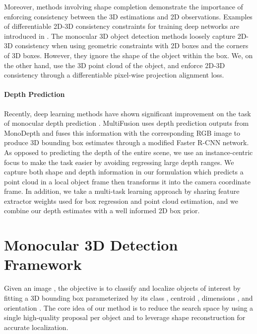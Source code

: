 \documentclass[10pt,twocolumn,letterpaper]{article}
\begin{document}
	Moreover, methods involving shape completion \cite{dai2017shape, firman2016structured, rock2015completing} demonstrate the importance of enforcing consistency between the 3D estimations and 2D observations. Examples of differentiable 2D-3D consistency constraints for training deep networks are introduced in \cite{rezende2016unsupervised, tulsiani2017multi, wu2017marrnet, wu2016single, yan2016perspective}. The monocular 3D object detection methods \cite{lindernoren, mousavian_deep3dbox} loosely capture 2D-3D consistency when using geometric constraints with 2D boxes and the corners of 3D boxes. However, they ignore the shape of the object within the box. We, on the other hand, use the 3D point cloud of the object, and enforce 2D-3D consistency through a differentiable pixel-wise projection alignment loss.
	
	\paragraph{Depth Prediction}
	Recently, deep learning methods have shown significant improvement on the task of monocular depth prediction \cite{fu2018dorn, godard, kuznietsov2017semi}. MultiFusion \cite{xu_multifusion} uses depth prediction outputs from MonoDepth \cite{godard} and fuses this information with the corresponding RGB image to produce 3D bounding box estimates through a modified Faster R-CNN network. As opposed to predicting the depth of the entire scene, we use an instance-centric focus to make the task easier by avoiding regressing large depth ranges. We capture both shape and depth information in our formulation which predicts a point cloud in a local object frame then transforms it into the camera coordinate frame. In addition, we take a multi-task learning approach by sharing feature extractor weights used for box regression and point cloud estimation, and we combine our depth estimates with a well informed 2D box prior.
	
	\section{Monocular 3D Detection Framework}
	Given an  image , the objective is to classify and localize objects of interest by fitting a 3D bounding box parameterized by its class , centroid , dimensions , and orientation . The core idea of our method is to reduce the search space by using a single high-quality proposal per object and to leverage shape reconstruction for accurate localization.
	
\end{document}
